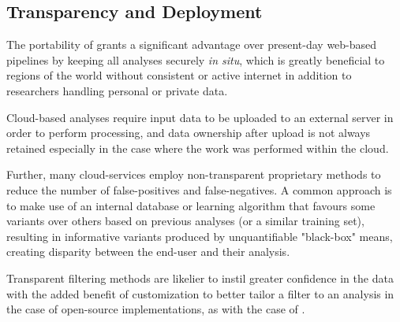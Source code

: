 \subsection{Transparency and Deployment}

The portability of \app grants a significant advantage over present-day web-based pipelines by keeping all analyses securely \textit{in situ}, which is greatly beneficial to regions of the world without consistent or active internet in addition to researchers handling personal or private data.

Cloud-based analyses require input data to be uploaded to an external server in order to perform processing, and data ownership after upload is not always retained especially in the case where the work was performed within the cloud.

Further, many cloud-services employ non-transparent proprietary methods to reduce the number of false-positives and false-negatives. A common approach is to make use of an internal database or learning algorithm that favours some variants over others based on previous analyses (or a similar training set), resulting in informative variants produced by unquantifiable "black-box" means, creating disparity between the end-user and their analysis.

Transparent filtering methods are likelier to instil greater confidence in the data with the added benefit of customization to better tailor a filter to an analysis in the case of open-source implementations, as with the case of \app.


